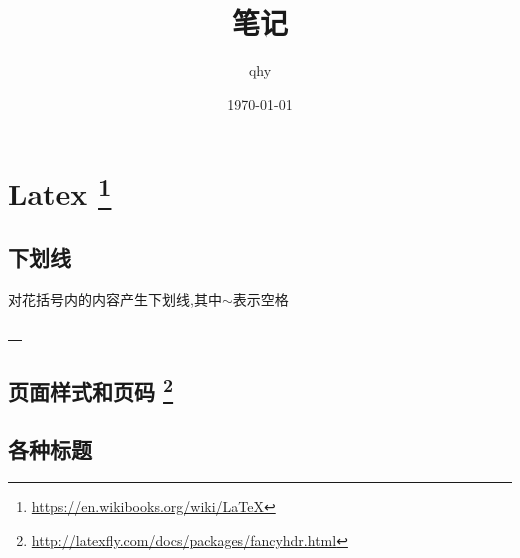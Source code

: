 \documentclass[UTF8,a4paper]{ctexart}
\author{qhy}
\date{\today}
\title{笔记}
\renewcommand{\sectionmark}[1]{\markboth{\thesection.\ #1}{}}
\renewcommand{\headrulewidth}{0.4pt}
\renewcommand{\footrulewidth}{0.4pt}
\begin{document}
    \maketitle
    
    \section[Latex]{Latex \footnote{\url{https://en.wikibooks.org/wiki/LaTeX}}}
        \subsection{下划线}
        对花括号内的内容产生下划线,其中$\sim$表示空格
        \begin{texcode}
\underline{~~}
        \end{texcode}

        \subsection[页面样式和页码]{页面样式和页码 \footnote{\url{http://latexfly.com/docs/packages/fancyhdr.html}}}
        \begin{texcode}
\usepackage{fancyhdr}

\pagestyle{fancy}
\renewcommand{\sectionmark}[1]{\markboth{\thesection.\ #1}{}}
\lhead{\bfseries \leftmark}

\chead{}
\rhead{}
\rfoot{\thepage}
\setlength{\headheight}{13pt}
\renewcommand{\headrulewidth}{0.4pt}
\renewcommand{\footrulewidth}{0.4pt}

        \end{texcode}


        \subsection{各种标题}
        \begin{texcode}
\chapter
\section
\subsection
\subsubsection
\paragraph
\subparagraph
        \end{texcode}
\end{document}
